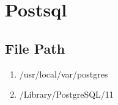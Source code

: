 \newpage
\section{Postsql}
    \subsection{File Path}
        \begin{enumerate}
            \item \colorbox{gray!30}{/usr/local/var/postgres}
            \item \colorbox{gray!30}{/Library/PostgreSQL/11}
        \end{enumerate}